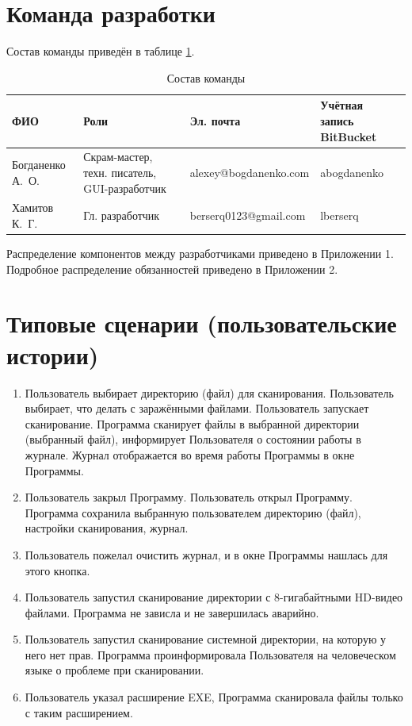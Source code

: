 \section{Команда разработки}
Состав команды приведён в таблице \ref{table:team}.
\begin{table}[h]
\centering
\begin{tabular}{|p{25mm}|p{35mm}|l|p{25mm}|}
\hline
ФИО & Роли & Эл. почта & Учётная запись BitBucket \\
\hline
Богданенко А.~О. & Скрам-мастер, техн. писатель, GUI-разработчик
& alexey@bogdanenko.com & abogdanenko \\
\hline
Хамитов К.~Г. & Гл. разработчик & berserq0123@gmail.com & lberserq \\
\hline
\end{tabular}
\caption{Состав команды}
\label{table:team}
\end{table}
Распределение компонентов между разработчиками приведено в Приложении 1.
Подробное распределение обязанностей приведено в Приложении 2.
\section{Типовые сценарии (пользовательские истории)}
\begin{enumerate}
\item Пользователь выбирает директорию (файл) для сканирования. Пользователь
выбирает, что делать с заражёнными файлами. Пользователь запускает сканирование.
Программа сканирует файлы в выбранной директории (выбранный файл), информирует
Пользователя о состоянии работы в журнале. Журнал отображается во время работы
Программы в окне Программы.
\item Пользователь закрыл Программу. Пользователь открыл Программу. Программа
сохранила выбранную пользователем директорию (файл), настройки сканирования,
журнал.
\item Пользователь пожелал очистить журнал, и в окне Программы нашлась для этого
кнопка.
\item Пользователь запустил сканирование директории с 8-гигабайтными HD-видео
файлами. Программа не зависла и не завершилась аварийно.
\item Пользователь запустил сканирование системной директории, на которую у него
нет прав. Программа проинформировала Пользователя на человеческом языке о
проблеме при сканировании.
\item Пользователь указал расширение EXE, Программа сканировала файлы только с
таким расширением.
\end{enumerate}
